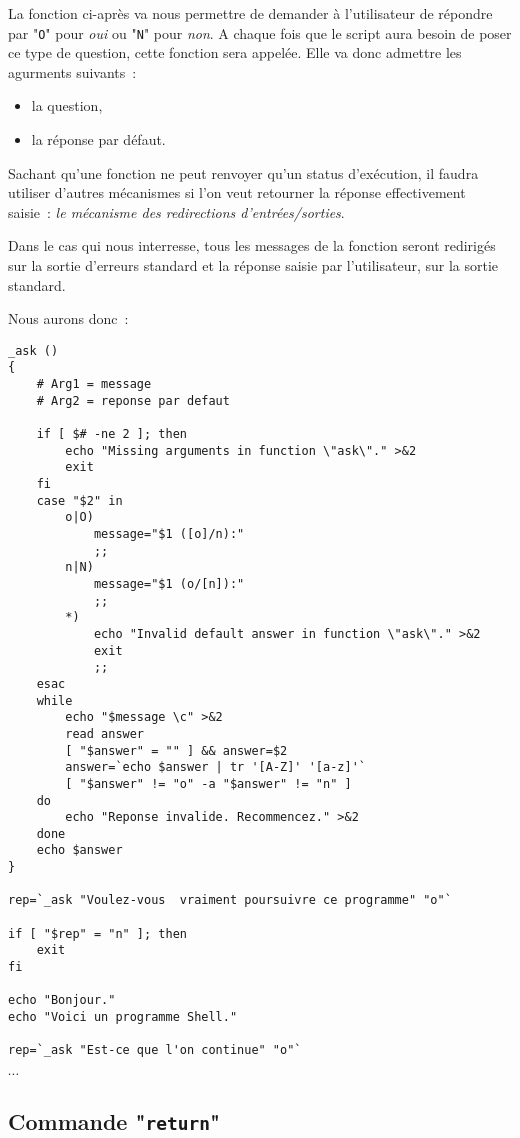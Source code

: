 \begin{example}
La fonction ci-apr{\`e}s va nous permettre de demander {\`a} l'utilisateur de r{\'e}pondre par
"\texttt{O}" pour {\sl oui} ou "\texttt{N}" pour {\sl non}. A chaque fois que le
script aura besoin de poser ce type de question, cette fonction sera appel{\'e}e. Elle
va donc admettre les agurments suivants~:
\begin{itemize}
	\item	la question,
	\item	la r{\'e}ponse par d{\'e}faut.
\end{itemize}

Sachant qu'une fonction ne peut renvoyer qu'un status d'ex{\'e}cution, il faudra utiliser d'autres
m{\'e}canismes si l'on veut retourner la r{\'e}ponse effectivement saisie~: {\sl le m{\'e}canisme des
redirections d'entr{\'e}es/sorties}.

Dans le cas qui nous interresse, tous les messages de la fonction seront redirig{\'e}s sur la sortie
d'erreurs standard et la r{\'e}ponse saisie par l'utilisateur, sur la sortie standard.

Nous aurons donc~:

\begin{verbatim}
_ask ()
{
    # Arg1 = message
    # Arg2 = reponse par defaut

    if [ $# -ne 2 ]; then
        echo "Missing arguments in function \"ask\"." >&2
        exit
    fi
    case "$2" in
        o|O)
            message="$1 ([o]/n):"
            ;;
        n|N)
            message="$1 (o/[n]):"
            ;;
        *)
            echo "Invalid default answer in function \"ask\"." >&2
            exit
            ;;
    esac
    while
        echo "$message \c" >&2
        read answer
        [ "$answer" = "" ] && answer=$2
        answer=`echo $answer | tr '[A-Z]' '[a-z]'`
        [ "$answer" != "o" -a "$answer" != "n" ]
    do
        echo "Reponse invalide. Recommencez." >&2
    done
    echo $answer
}

rep=`_ask "Voulez-vous  vraiment poursuivre ce programme" "o"`

if [ "$rep" = "n" ]; then
    exit
fi

echo "Bonjour."
echo "Voici un programme Shell."

rep=`_ask "Est-ce que l'on continue" "o"`
\end{verbatim}
$\cdots$
\end{example}

\subsection{Commande "\texttt{return}"}

